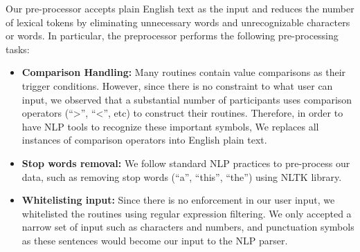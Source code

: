 Our pre-processor accepts plain English text as the input and reduces the number of lexical tokens by eliminating unnecessary words and unrecognizable characters or words. In particular, the preprocessor performs the following pre-processing tasks:
\begin{itemize}
    \item \textbf{Comparison Handling: } Many routines contain value comparisons as their trigger conditions. However, since there is no constraint to what user can input, we observed that a substantial number of participants uses comparison operators (\eg ``>'', ``<'', etc) to construct their routines. Therefore, in order to have NLP tools to recognize these important symbols, We replaces all instances of comparison operators into English plain text. 
    \item \textbf{Stop words removal: } We follow standard NLP practices to pre-process our data, such as removing stop words (\eg ``a'', ``this'', ``the'') using NLTK library. 
    \item \textbf{Whitelisting input: } Since there is no enforcement in our user input, we whitelisted the routines using regular expression filtering. We only accepted a narrow set of input such as characters and numbers, and punctuation symbols as these sentences would become our input to the NLP parser.
\end{itemize}


